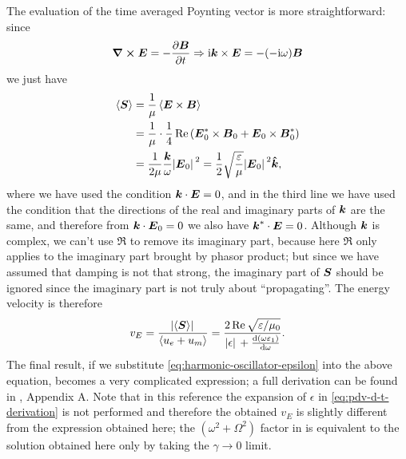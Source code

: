 \documentclass[hyperref, a4paper]{article}
\newcommand*{\ii}{\mathrm{i}}
\begin{document}
The evaluation of the time averaged Poynting vector is more straightforward:
since 
\begin{equation}
    \begin{aligned}
        \curl{\vb*{E}} = - \pdv{\vb*{B}}{t} &\Rightarrow
        \ii \vb*{k} \times \vb*{E} = - (- \ii \omega) \vb*{B} \\
    \end{aligned}
\end{equation}
we just have 
\begin{equation}
    \begin{aligned}
        \expval{\vb*{S}} &= \frac{1}{\mu} \expval{\vb*{E} \times \vb*{B}} \\
        &= \frac{1}{\mu} \cdot \frac{1}{4} \Re \left(
            \vb*{E}^*_0 \times \vb*{B}_0 + \vb*{E}_0 \times \vb*{B}^*_0 
        \right) \\
        &= \frac{1}{2 \mu} \frac{\vb*{k}}{\omega} \abs*{\vb*{E}_0}^2
        = \frac{1}{2} \sqrt{\frac{\varepsilon}{\mu}} \abs*{\vb*{E}_0}^2 \vu*{k} ,
    \end{aligned}
\end{equation}
where we have used the condition $\vb*{k} \cdot \vb*{E} = 0$,
and in the third line we have used the condition that 
the directions of the real and imaginary parts of $\vb*{k}$
are the same, and therefore 
from $\vb*{k} \cdot \vb*{E}_0 = 0$ we also have 
$\vb*{k}^* \cdot \vb*{E} = 0$.
Although $\vb*{k}$ is complex, 
we can't use $\Re$ to remove its imaginary part, 
because here $\Re$ only applies to the imaginary part 
brought by phasor product;
but since we have assumed that damping is not that strong, 
the imaginary part of $\vb*{S}$ should be ignored 
since the imaginary part is not truly about ``propagating''.
The energy velocity is therefore 
\begin{equation}
    v_{E} = \frac{\abs*{\expval{\vb*{S}}}}{\expval{u_e + u_m}}
    = \frac{
        2 \Re \sqrt{\varepsilon / \mu_0}
    }{
        \abs*{\epsilon} + \dv{(\omega \varepsilon_1)}{\omega}
    }.
\end{equation}
The final result, if we substitute \eqref{eq:harmonic-oscillator-epsilon} 
into the above equation, becomes 
a very complicated expression;
a full derivation can be found in \cite{bolda1994optical}, Appendix A. 
Note that in this reference the expansion of $\epsilon$ in \eqref{eq:pdv-d-t-derivation}
is not performed and therefore the obtained $v_E$
is slightly different from the expression obtained here; 
the $(\omega^2 + \Omega^2)$ factor in \cite{bolda1994optical}
is equivalent to the solution obtained here
only by taking the $\gamma \to 0$ limit.
\end{document}
